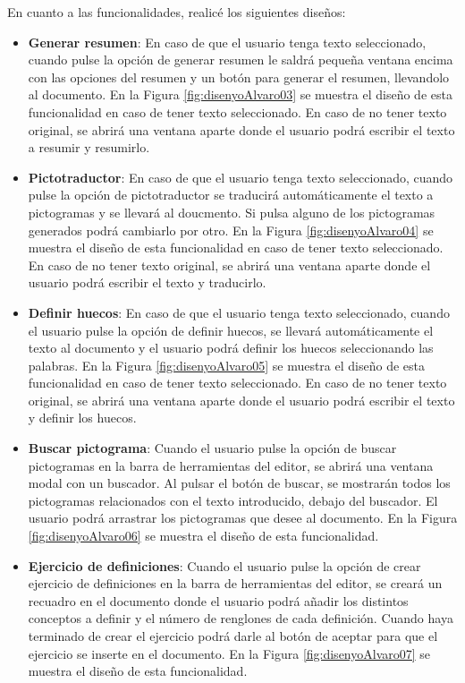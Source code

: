 En cuanto a las funcionalidades, realicé los siguientes diseños:
\begin{itemize}
  \item \textbf{Generar resumen}: En caso de que el usuario tenga texto seleccionado, cuando pulse la opción de generar resumen le saldrá pequeña ventana encima con las opciones del resumen y un botón para generar el resumen, llevandolo al documento. En la Figura \ref{fig:disenyoAlvaro03} se muestra el diseño de esta funcionalidad en caso de tener texto seleccionado. En caso de no tener texto original, se abrirá una ventana aparte donde el usuario podrá escribir el texto a resumir y resumirlo.
  \item \textbf{Pictotraductor}: En caso de que el usuario tenga texto seleccionado, cuando pulse la opción de pictotraductor se traducirá automáticamente el texto a pictogramas y se llevará al doucmento. Si pulsa alguno de los pictogramas generados podrá cambiarlo por otro. En la Figura \ref{fig:disenyoAlvaro04} se muestra el diseño de esta funcionalidad en caso de tener texto seleccionado. En caso de no tener texto original, se abrirá una ventana aparte donde el usuario podrá escribir el texto y traducirlo.
  \item \textbf{Definir huecos}: En caso de que el usuario tenga texto seleccionado, cuando el usuario pulse la opción de definir huecos, se llevará automáticamente el texto al documento y el usuario podrá definir los huecos seleccionando las palabras. En la Figura \ref{fig:disenyoAlvaro05} se muestra el diseño de esta funcionalidad en caso de tener texto seleccionado. En caso de no tener texto original, se abrirá una ventana aparte donde el usuario podrá escribir el texto y definir los huecos.
  \item \textbf{Buscar pictograma}: Cuando el usuario pulse la opción de buscar pictogramas en la barra de herramientas del editor, se abrirá una ventana modal con un buscador. Al pulsar el botón de buscar, se mostrarán todos los pictogramas relacionados con el texto introducido, debajo del buscador.
        El usuario podrá arrastrar los pictogramas que desee al documento. En la Figura \ref{fig:disenyoAlvaro06} se muestra el diseño de esta funcionalidad.
  \item \textbf{Ejercicio de definiciones}: Cuando el usuario pulse la opción de crear ejercicio de definiciones en la barra de herramientas del editor, se creará un recuadro en el documento donde el usuario podrá añadir los distintos conceptos a definir y el número de renglones de cada definición. Cuando haya terminado de crear el ejercicio podrá darle al botón de aceptar para que el ejercicio se inserte en el documento. En la Figura \ref{fig:disenyoAlvaro07} se muestra el diseño de esta funcionalidad.

\end{itemize}
